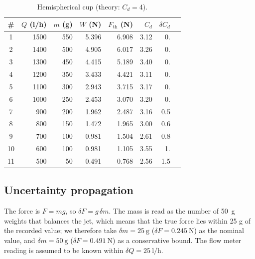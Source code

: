 \documentclass[11pt,a4paper]{article}
\numberwithin{equation}{section}
\newcommand{\Cd}{C_d}
\newcommand{\Fth}{F_{\mathrm{th}}}
\begin{document}
\begin{table}[htbp]
\centering
\small
\caption{Hemispherical cup (theory: $\Cd=4$).}
\label{tab:hemi}
\begin{tabular}{c r r r r r r r}
\toprule
\# & {$Q$ (l/h)} & {$m$ (g)} & {$W$ (N)} & {$\Fth$ (N)} & {$\Cd$} & {$\delta\Cd$} \\
\midrule
1 & 1500 & 550 & 5.396 & 6.908 & 3.12 & 0.\\
2 & 1400 & 500 & 4.905 & 6.017 & 3.26 & 0. \\
3 & 1300 & 450 & 4.415 & 5.189 & 3.40 & 0. \\
4 & 1200 & 350 & 3.433 & 4.421 & 3.11 & 0. \\
5 & 1100 & 300 & 2.943 & 3.715 & 3.17 & 0. \\
6 & 1000 & 250 & 2.453 & 3.070 & 3.20 & 0. \\
7 & 900 & 200 & 1.962 & 2.487 & 3.16 & 0.5 \\
8 & 800 & 150 & 1.472 & 1.965 & 3.00 & 0.6 \\
9 & 700 & 100 & 0.981 & 1.504 & 2.61 & 0.8 \\
10 & 600 & 100 & 0.981 & 1.105 & 3.55 & 1. \\
11 & 500 & 50 & 0.491 & 0.768 & 2.56 & 1.5 \\
\bottomrule
\end{tabular}
\end{table}

\subsection{Uncertainty propagation}

The force is $F=mg$, so $\delta F=g\,\delta m$. The mass is read as the number of \SI{50}{\gram} weights that balances the jet, which means that the true force lies within 25 g of the recorded value; we therefore take $\delta m=\SI{25}{\gram}$ ($\delta F=\SI{0.245}{\newton}$) as the nominal value, and $\delta m=\SI{50}{\gram}$ ($\delta F=\SI{0.491}{\newton}$) as a conservative bound. The flow meter reading is assumed to be known within $\delta Q=\SI{25}{\litre\per\hour}$.
\end{document}

